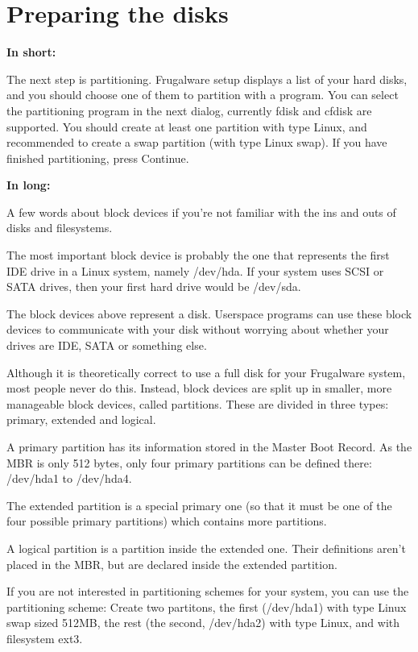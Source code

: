 \section{Preparing the disks}

\textbf{In short:}

The next step is partitioning. Frugalware setup displays a 
list of your hard disks, and you should choose one of them 
to partition with a program. You can select the 
partitioning program in the next dialog, currently fdisk 
and cfdisk are supported. You should create at least one 
partition with type Linux, and recommended to create a swap 
partition (with type Linux swap). If you have finished 
partitioning, press Continue.

\textbf{In long:}

A few words about block devices if you're not familiar with
the ins and outs of disks and filesystems.

The most important block device is probably the one that
represents the first IDE drive in a Linux system, namely
/dev/hda. If your system uses SCSI or SATA drives, then
your first hard drive would be /dev/sda.

The block devices above represent a disk. Userspace
programs can use these block devices to communicate with
your disk without worrying about whether your drives are
IDE, SATA or something else.

Although it is theoretically correct to use a full disk for
your Frugalware system, most people never do this. Instead,
block devices are split up in smaller, more manageable
block devices, called partitions. These are divided in
three types: primary, extended and logical.

A primary partition has its information stored in the
Master Boot Record. As the MBR is only 512 bytes, only four
primary partitions can be defined there: /dev/hda1 to
/dev/hda4.

The extended partition is a special primary one (so that it
must be one of the four possible primary partitions) which
contains more partitions.

A logical partition is a partition inside the extended one.
Their definitions aren't placed in the MBR, but are declared inside the extended partition.

If you are not interested in partitioning schemes for your
system, you can use the partitioning scheme: Create two partitons, the first (/dev/hda1) with type Linux swap sized 512MB, the rest (the second, /dev/hda2) with type Linux, and with filesystem ext3.

